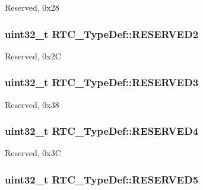 Reserved, 0x28 \hypertarget{struct_r_t_c___type_def_afddb6b2f393c94ea6c68780fe04f298f}{
\subsubsection[{R\-E\-S\-E\-R\-V\-E\-D2}]{\setlength{\rightskip}{0pt plus 5cm}uint32\-\_\-t R\-T\-C\-\_\-\-Type\-Def\-::\-R\-E\-S\-E\-R\-V\-E\-D2}}\label{struct_r_t_c___type_def_afddb6b2f393c94ea6c68780fe04f298f}
Reserved, 0x2\-C \hypertarget{struct_r_t_c___type_def_ab8970cf003966d22733fd660df6e74d7}{
\subsubsection[{R\-E\-S\-E\-R\-V\-E\-D3}]{\setlength{\rightskip}{0pt plus 5cm}uint32\-\_\-t R\-T\-C\-\_\-\-Type\-Def\-::\-R\-E\-S\-E\-R\-V\-E\-D3}}\label{struct_r_t_c___type_def_ab8970cf003966d22733fd660df6e74d7}
Reserved, 0x38 \hypertarget{struct_r_t_c___type_def_a541e93bdbd07770ebc448412f3456877}{
\subsubsection[{R\-E\-S\-E\-R\-V\-E\-D4}]{\setlength{\rightskip}{0pt plus 5cm}uint32\-\_\-t R\-T\-C\-\_\-\-Type\-Def\-::\-R\-E\-S\-E\-R\-V\-E\-D4}}\label{struct_r_t_c___type_def_a541e93bdbd07770ebc448412f3456877}
Reserved, 0x3\-C \hypertarget{struct_r_t_c___type_def_a12ca87774a5947ec10cbc9feb13e6de6}{
\subsubsection[{R\-E\-S\-E\-R\-V\-E\-D5}]{\setlength{\rightskip}{0pt plus 5cm}uint32\-\_\-t R\-T\-C\-\_\-\-Type\-Def\-::\-R\-E\-S\-E\-R\-V\-E\-D5}}\label{struct_r_t_c___type_def_a12ca87774a5947ec10cbc9feb13e6de6}
